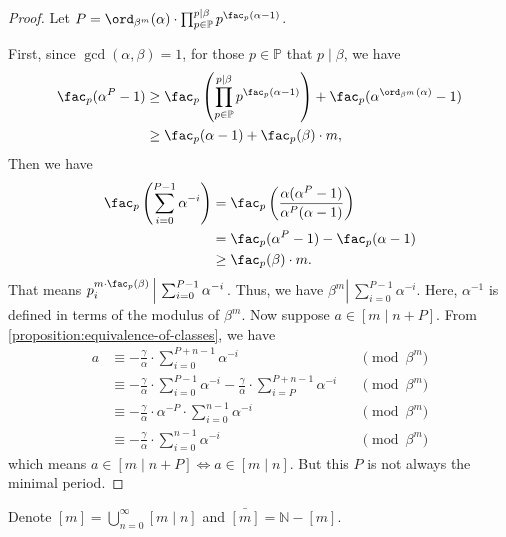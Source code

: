 \begin{proof}
    Let $P = \ord_{\beta^{m}}(\alpha) \cdot \prod_{p\in\mathbb{P}}^{p \mid \beta}p^{\fac_{p}(\alpha-1)}$.

    First, since $\gcd(\alpha, \beta) = 1$, for those $p \in \mathbb{P}$ that $p \mid \beta$, we have
    \begin{align*}
        \fac_{p}(\alpha^P - 1) & \ge \fac_{p}\left(\prod_{p\in\mathbb{P}}^{p \mid \beta}p^{\fac_{p}(\alpha-1)}\right) + \fac_{p}(\alpha^{\ord_{\beta^{m}}(\alpha)} - 1) \\
                                 & \ge \fac_{p}(\alpha-1) + \fac_{p}(\beta) \cdot m,
    \end{align*}
    Then we have
    \begin{align*}
        \fac_{p}\left(\sum_{i=0}^{P - 1}\alpha^{-i}\right) & = \fac_{p}\left(\frac{\alpha(\alpha^{P} - 1)}{\alpha^{P}(\alpha - 1)}\right) \\
                &= \fac_{p}(\alpha^P - 1) - \fac_{p}(\alpha-1) \\
                &\ge \fac_{p}(\beta) \cdot m.
    \end{align*}
    That means $p_{i}^{m \cdot \fac_{p}(\beta)} \left\vert\ \sum_{i=0}^{P - 1}\alpha^{-i} \right. $.
    Thus, we have $\beta^{m} \left\vert\ \sum_{i=0}^{P - 1}\alpha^{-i} \right. $.
    Here, $\alpha^{-1}$ is defined in terms of the modulus of $\beta^{m}$. \newline
    Now suppose $a \in [m \mid n + P]$.
    From \cref{proposition:equivalence-of-classes}, we have
    \begin{align*}
        a   &\equiv -\frac{\gamma}{\alpha}\cdot\sum_{i=0}^{P+n-1}\alpha^{-i}    &&\pmod{\beta^{m}} \\
            &\equiv -\frac{\gamma}{\alpha}\cdot\sum_{i=0}^{P - 1}\alpha^{-i} - \frac{\gamma}{\alpha}\cdot\sum_{i=P}^{P + n - 1}\alpha^{-i}    &&\pmod{\beta^{m}} \\
            &\equiv - \frac{\gamma}{\alpha}\cdot\alpha^{-P} \cdot\sum_{i=0}^{n - 1}\alpha^{-i}    &&\pmod{\beta^{m}} \\
            &\equiv -\frac{\gamma}{\alpha}\cdot\sum_{i=0}^{n - 1}\alpha^{-i}    &&\pmod{\beta^{m}}
    \end{align*}
    which means $a \in [ m \mid n + P] \Longleftrightarrow a \in [m \mid n]$.
    But this $P$ is not always the minimal period.
\end{proof}
\begin{definition}
    Denote $[m] = \bigcup_{n=0}^{\infty}[m\mid n]$ and $\bar{[m]} = \mathbb{N} - [m]$.
\end{definition}
